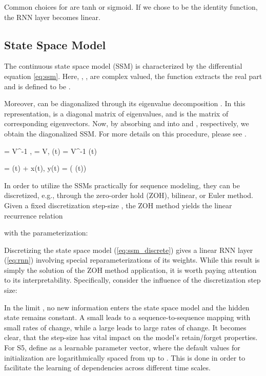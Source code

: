 \documentclass{article} \usepackage{iclr2024_conference,times}
\begin{document}
Common choices for  are tanh or sigmoid. If we chose  to be the identity function, the RNN layer becomes linear. 

\subsection{State Space Model}
The continuous state space model (SSM) is characterized by the  differential equation \ref{eq:ssm}. Here, , ,  are complex valued, the function  extracts the real part and  is defined to be . 


Moreover,  can be diagonalized through its eigenvalue decomposition . In this representation,  is a diagonal matrix of eigenvalues, and  is the matrix of corresponding eigenvectors. Now, by absorbing  and  into  and , respectively, we obtain the diagonalized SSM. For more details on this procedure, please see \cite{smith2023simplified}.

 = V^{-1} , \quad {} =  V, \quad {}(t) = V^{-1} (t)

 = \Lambda {}(t) +  x(t), \quad y(t) = \Re( (t))


In order to utilize the SSMs practically for sequence modeling, they can be discretized, e.g., through the zero-order hold (ZOH), bilinear, or Euler method. Given a fixed discretization step-size , the ZOH method yields the linear recurrence relation

with the parameterization:

Discretizing the state space model (\ref{eq:ssm_discrete}) gives a linear RNN layer (\ref{eq:rnn}) involving special reparameterizations of its weights. While this result is simply the solution of the ZOH method application, it is worth paying attention to its interpretability. Specifically, consider the influence of the discretization step size:

In the limit , no new information enters the state space model and the hidden state remains constant. A small  leads to a sequence-to-sequence mapping with small rates of change, while a large  leads to large rates of change. It becomes clear, that the step-size has vital impact on the model's retain/forget properties. For S5, \cite{smith2023simplified} define  as a learnable parameter vector, where the default values for initialization are logarithmically spaced from  up to . This is done in order to facilitate the learning of dependencies across different time scales. 
\end{document}
